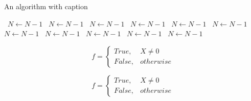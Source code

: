 \documentclass[a4paper]{article}
\begin{document}
\begin{algorithm}
\caption{An algorithm with caption}
\begin{algorithmic}
\    \State $N \gets N - 1$
\    \State $N \gets N - 1$
\    \State $N \gets N - 1$
\    \State $N \gets N - 1$
\    \State $N \gets N - 1$
\    \State $N \gets N - 1$
\    \State $N \gets N - 1$
\    \State $N \gets N - 1$
\    \State $N \gets N - 1$
\    \State $N \gets N - 1$
\    \State $N \gets N - 1$
\EndWhile
\end{algorithmic}
\end{algorithm}

\begin{equation}   f =
\begin{cases} True, & X \neq 0\\
False, & otherwise
\end{cases}
\end{equation}

\begin{equation}   f =
\begin{cases} True, & X \neq 0\\
False, & otherwise
\end{cases}
\end{equation}
\end{document}
